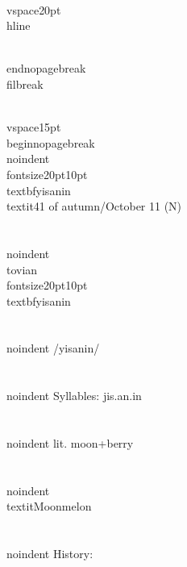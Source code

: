 \\vspace{20pt}\\hline

\\end{nopagebreak}
\\filbreak



\\vspace{15pt}
\\begin{nopagebreak}
\\noindent{\\fontsize{20pt}{10pt}\\textbf{yisanin} } \\textit{41 of autumn/October 11} (N)\\\\
\\noindent {\\tovian \\fontsize{20pt}{10pt} \\textbf{yisanin} }\\\\
\\noindent /yis{\textprimstress}anin/\\\\
\\noindent Syllables: jis.an.in\\\\
\\noindent lit. moon+berry\\\\
\\noindent \\textit{Moonmelon}\\\\


\\noindent History:

